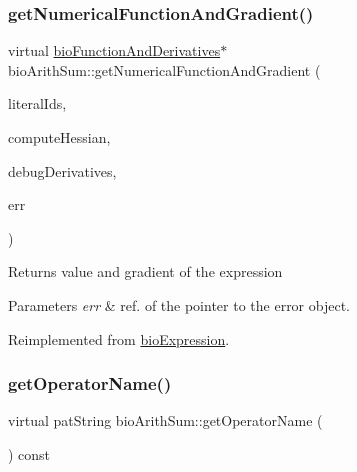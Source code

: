 \subsubsection{\texorpdfstring{get\+Numerical\+Function\+And\+Gradient()}{getNumericalFunctionAndGradient()}\hspace{0.1cm}{\footnotesize\ttfamily [4/4]}}
{\footnotesize\ttfamily virtual \hyperlink{classbio_function_and_derivatives}{bio\+Function\+And\+Derivatives}$\ast$ bio\+Arith\+Sum\+::get\+Numerical\+Function\+And\+Gradient (\begin{DoxyParamCaption}\item[{vector$<$ pat\+U\+Long $>$}]{literal\+Ids,  }\item[{pat\+Boolean}]{compute\+Hessian,  }\item[{pat\+Boolean}]{debug\+Derivatives,  }\item[{pat\+Error $\ast$\&}]{err }\end{DoxyParamCaption})\hspace{0.3cm}{\ttfamily [virtual]}}

\begin{DoxyReturn}{Returns}
value and gradient of the expression 
\end{DoxyReturn}

\begin{DoxyParams}{Parameters}
{\em err} & ref. of the pointer to the error object. \\
\hline
\end{DoxyParams}


Reimplemented from \hyperlink{classbio_expression_a91c81ce80c9e972c913b10f5f3c1ed13}{bio\+Expression}.

\mbox{\label{classbio_arith_sum_a9e0ab0b9062a7cd80e70fc16505bc282}} 
\subsubsection{\texorpdfstring{get\+Operator\+Name()}{getOperatorName()}\hspace{0.1cm}{\footnotesize\ttfamily [1/4]}}
{\footnotesize\ttfamily virtual pat\+String bio\+Arith\+Sum\+::get\+Operator\+Name (\begin{DoxyParamCaption}{ }\end{DoxyParamCaption}) const\hspace{0.3cm}{\ttfamily [virtual]}}


